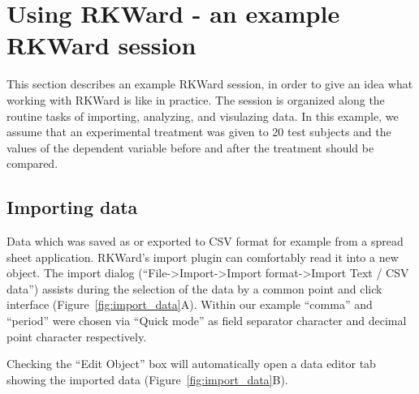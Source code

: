 \section{Using RKWard - an example RKWard session}
\label{sec:using_RKWard}
This section describes an example RKWard session, in order to give an idea
what working with RKWard is like in practice.
The session is organized along the routine tasks of importing,
analyzing, and visulazing data. In this example, we assume that an experimental
treatment was given to 20 test subjects and the values of the dependent
variable before and after the treatment should be compared. 

\subsection{Importing data}
\label{sec:importing_data}
Data which was saved as or exported to CSV format for example from a
spread sheet application. RKWard's import plugin can
comfortably read it into a new  object.
The import dialog (``File->Import->Import
format->Import Text / CSV data'') assists during the
selection of the data by a common point and click interface (Figure~\ref{fig:import_data}A). Within our
example ``comma'' and ``period'' were chosen via ``Quick mode'' as field
separator character and decimal point character respectively.


Checking the ``Edit Object'' box will automatically open a data editor tab
showing the imported data (Figure~\ref{fig:import_data}B).

